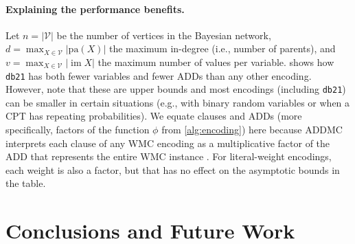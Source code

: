 \documentclass[letterpaper]{article} %
\DeclareMathOperator{\im}{im}
\theoremstyle{definition}
\theoremstyle{remark}
\begin{document}
{\paragraph{Explaining the performance benefits.} Let $n = |\mathcal{V}|$ be the
number of vertices in the Bayesian network, $d = \max_{X \in \mathcal{V}}
|\mathrm{pa}(X)|$ the maximum in-degree (i.e., number of parents), and $v =
\max_{X \in \mathcal{V}} |\im X|$ the maximum number of values per variable.
 shows how \texttt{db21} has both fewer variables and fewer
ADDs than any other encoding. However, note that these are upper bounds and most
encodings (including \texttt{db21}) can be smaller in certain situations (e.g.,
with binary random variables or when a CPT has repeating probabilities). We
equate clauses and ADDs (more specifically, factors of the function $\phi$ from
\cref{alg:encoding}) here because ADDMC interprets each clause of any WMC
encoding as a multiplicative factor of the ADD that represents the entire WMC
instance \cite{DBLP:conf/aaai/DudekPV20}. For literal-weight encodings, each
weight is also a factor, but that has no effect on the asymptotic bounds in the
table.


\section{Conclusions and Future Work} %

}
\end{document}
